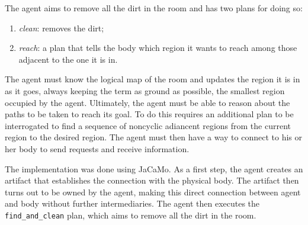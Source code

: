 The agent aims to remove all the dirt in the room and has two plans for doing so:
\begin{enumerate}
    \item \textit{clean}: removes the dirt;
    \item \textit{reach}: a plan that tells the body which region it wants to reach among those adjacent to the one it is in.
\end{enumerate}
The agent must know the logical map of the room and updates the region it is in as it goes, always keeping the term as ground as possible, the smallest region occupied by the agent.
Ultimately, the agent must be able to reason about the paths to be taken to reach its goal.
To do this requires an additional plan to be interrogated to find a sequence of noncyclic adiancent regions from the current region to the desired region.
The agent must then have a way to connect to his or her body to send requests and receive information.

The implementation was done using JaCaMo\cite{jacamo}.
As a first step, the agent creates an artifact that establishes the connection with the physical body.
The artifact then turns out to be owned by the agent, making this direct connection between agent and body without further intermediaries.
The agent then executes the \texttt{find\_and\_clean} plan, which aims to remove all the dirt in the room. 

